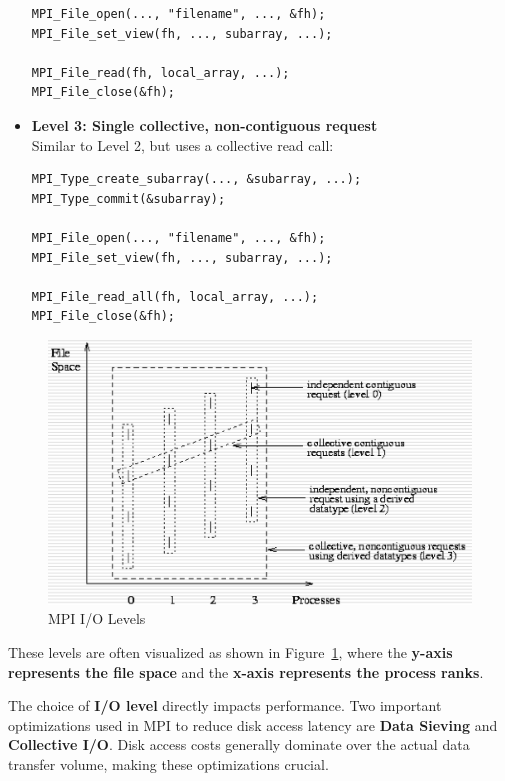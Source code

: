 \documentclass[12pt]{book}
\begin{document}
\begin{itemize}
\begin{lstlisting}[style=cppstyle]
MPI_File_open(..., "filename", ..., &fh);
MPI_File_set_view(fh, ..., subarray, ...);

MPI_File_read(fh, local_array, ...);
MPI_File_close(&fh);
    \end{lstlisting}

    \item \textbf{Level 3: Single collective, non-contiguous request} \\
    Similar to Level 2, but uses a collective read call:
    \begin{lstlisting}[style=cppstyle]
MPI_Type_create_subarray(..., &subarray, ...);
MPI_Type_commit(&subarray);

MPI_File_open(..., "filename", ..., &fh);
MPI_File_set_view(fh, ..., subarray, ...);

MPI_File_read_all(fh, local_array, ...);
MPI_File_close(&fh);
    \end{lstlisting}
\end{itemize}
\begin{figure}[ht]
    \centering
    \includegraphics[width=0.75\linewidth]{images/io_levels.png}
    \caption{MPI I/O Levels}
    \label{fig:mpi_io_levels}
\end{figure}
These levels are often visualized as shown in Figure~\ref{fig:mpi_io_levels}, where the \textbf{y-axis represents the file space} and the \textbf{x-axis represents the process ranks}.

The choice of \textbf{I/O level} directly impacts performance. Two important optimizations used in MPI to reduce disk access latency are \textbf{Data Sieving} and \textbf{Collective I/O}. Disk access costs generally dominate over the actual data transfer volume, making these optimizations crucial.
\end{document}
